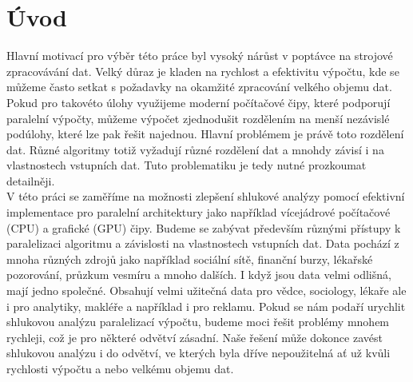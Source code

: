 \pagestyle{plain}
\setcounter{page}{1}

\chapter{Úvod}
Hlavní motivací pro výběr této práce byl vysoký nárůst v poptávce na strojové zpracovávání dat. Velký důraz je kladen na rychlost a efektivitu výpočtu, kde se můžeme často setkat s požadavky na okamžité zpracování velkého objemu dat.
Pokud pro takovéto úlohy využijeme moderní počítačové čipy, které podporují paralelní výpočty, můžeme výpočet zjednodušit rozdělením na menší nezávislé podúlohy, které lze pak řešit najednou. Hlavní problémem je právě toto rozdělení dat. Různé algoritmy totiž vyžadují různé rozdělení dat a mnohdy závisí i na vlastnostech vstupních dat. Tuto problematiku je tedy nutné prozkoumat detailněji.\\

V této práci se zaměříme na možnosti zlepšení shlukové analýzy pomocí efektivní implementace pro paralelní architektury jako například vícejádrové počítačové (CPU) a grafické (GPU) čipy. Budeme se zabývat především různými přístupy k paralelizaci algoritmu a závislosti na vlastnostech vstupních dat.
Data pochází z mnoha různých zdrojů jako například sociální sítě, finanční burzy, lékařské pozorování, průzkum vesmíru a mnoho dalších. I když jsou data velmi odlišná, mají jedno společné. Obsahují velmi užitečná data pro vědce, sociology, lékaře ale i pro analytiky, makléře a například i pro reklamu.
Pokud se nám podaří urychlit shlukovou analýzu paralelizací výpočtu, budeme moci řešit problémy mnohem rychleji, což je pro některé odvětví zásadní. Naše řešení může dokonce zavést shlukovou analýzu i do odvětví, ve kterých byla dříve nepoužitelná ať už kvůli rychlosti výpočtu a nebo velkému objemu dat.\\

